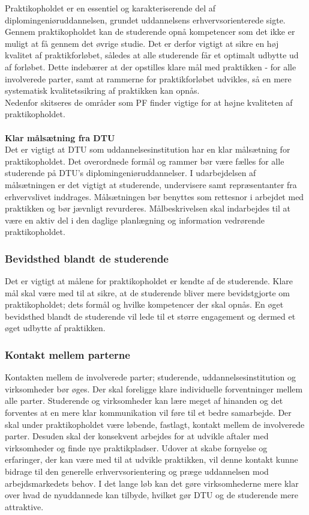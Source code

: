 Praktikopholdet er en essentiel og karakteriserende del af diplomingeniøruddannelsen, grundet uddannelsens erhvervsorienterede sigte. Gennem praktikopholdet kan de studerende opnå kompetencer som det ikke er muligt at få gennem det øvrige studie. Det er derfor vigtigt at sikre en høj kvalitet af praktikforløbet, således at alle studerende får et optimalt udbytte ud af forløbet. Dette indebærer at der opstilles klare mål med praktikken - for alle involverede parter, samt at rammerne for praktikforløbet udvikles, så en mere systematisk kvalitetssikring af praktikken kan opnås.\\

Nedenfor skitseres de områder som PF finder vigtige for at højne kvaliteten af praktikopholdet.\\
\\
\textbf{Klar målsætning fra DTU}\\
Det er vigtigt at DTU som uddannelsesinstitution har en klar målsætning for praktikopholdet. Det overordnede formål og rammer bør være fælles for alle studerende på DTU’s diplomingeniøruddannelser. I udarbejdelsen af målsætningen er det vigtigt at studerende, undervisere samt repræsentanter fra erhvervslivet inddrages. Målsætningen bør benyttes som rettesnor i arbejdet med praktikken og bør jævnligt revurderes. Målbeskrivelsen skal indarbejdes til at være en aktiv del i den daglige planlægning og information vedrørende praktikopholdet.

\subsubsection{Bevidsthed blandt de studerende}
Det er vigtigt at målene for praktikopholdet er kendte af de studerende. Klare mål skal være med til at sikre, at de studerende bliver mere bevidstgjorte om praktikopholdet; dets formål og hvilke kompetencer der skal opnås. En øget bevidsthed blandt de studerende vil lede til et større engagement og dermed et øget udbytte af praktikken.

\subsubsection{Kontakt mellem parterne}
Kontakten mellem de involverede parter; studerende, uddannelsesinstitution og virksomheder bør øges. Der skal foreligge klare individuelle forventninger mellem alle parter. Studerende og virksomheder kan lære meget af hinanden og det forventes at en mere klar kommunikation vil føre til et bedre samarbejde. Der skal under praktikopholdet være løbende, fastlagt, kontakt mellem de involverede parter. Desuden skal der konsekvent arbejdes for at udvikle aftaler med virksomheder og finde nye praktikpladser. Udover at skabe fornyelse og erfaringer, der kan være med til at udvikle praktikken, vil denne kontakt kunne bidrage til den generelle erhvervsorientering og præge uddannelsen mod arbejdsmarkedets behov. I det lange løb kan det gøre virksomhederne mere klar over hvad de nyuddannede kan tilbyde, hvilket gør DTU og de studerende mere attraktive.

